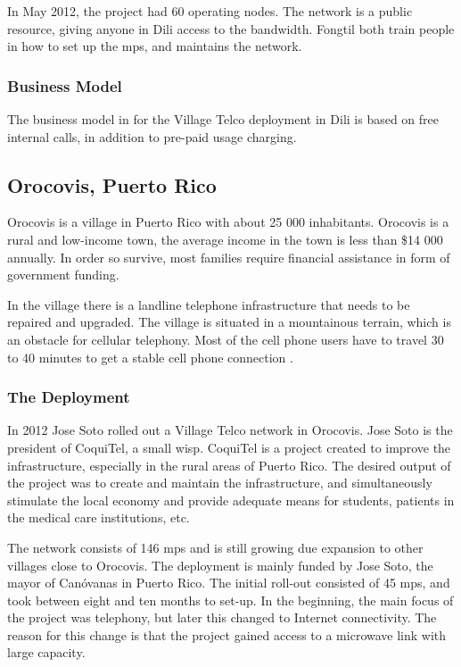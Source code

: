 In May 2012, the project had 60 operating nodes. The network is a public resource, giving anyone in Dili access to the bandwidth. Fongtil both train people in how to set up the \glspl{mp}, and maintains the network.


\subsubsection{Business Model}
The business model in for the Village Telco deployment in Dili is based on free internal calls, in addition to pre-paid usage charging.  

\subsection{Orocovis, Puerto Rico}
Orocovis is a village in Puerto Rico with about 25 000 inhabitants. Orocovis is a rural and low-income town, the average income in the town is less than \$14 000 annually. In order so survive, most families require financial assistance in form of government funding.   

In the village there is a landline telephone infrastructure that needs to be repaired and upgraded. The village is situated in a mountainous terrain, which is an obstacle for cellular telephony. Most of the cell phone users have to travel 30 to 40 minutes to get a stable cell phone connection \cite{vtpuertorico, soto}. 

\subsubsection{The Deployment}
In 2012 Jose Soto rolled out a Village Telco network in Orocovis. Jose Soto is the president of CoquiTel, a small \gls{wisp}. CoquiTel is a project created to improve the infrastructure, especially in the rural areas of Puerto Rico. The desired output of the project was to create and maintain the infrastructure, and simultaneously stimulate the local economy and provide adequate means for students, patients in the medical care institutions, etc.

The network consists of 146 \glspl{mp} and is still growing due expansion to other villages close to Orocovis. The deployment is mainly funded by Jose Soto, the mayor of Canóvanas in Puerto Rico\cite{vtpuertorico}. The initial roll-out consisted of 45 \glspl{mp}, and took between eight and ten months to set-up. In the beginning, the main focus of the project was telephony, but later this changed to Internet connectivity. The reason for this change is that the project gained access to a microwave link with large capacity. 

